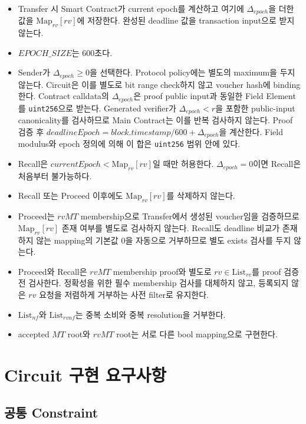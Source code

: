 \documentclass[11pt,a4paper]{extarticle}
\newcommand{\List}[1]{\mathrm{List}_{#1}}
\newcommand{\Map}[1]{\mathrm{Map}_{#1}}
\begin{document}
\begin{itemize}
  \item Transfer 시 Smart Contract가 current epoch를 계산하고 여기에
        $\Delta_{epoch}$을 더한 값을 $\Map{rv}[rv]$에 저장한다. 완성된 deadline
        값을 transaction input으로 받지 않는다.
  \item $EPOCH\_SIZE$는 600초다.
  \item Sender가 $\Delta_{epoch}\geq0$을 선택한다. Protocol policy에는 별도의
        maximum을 두지 않는다. Circuit은 이를 별도로 bit range check하지 않고
        voucher hash에 binding한다. Contract calldata의 $\Delta_{epoch}$은 proof public
        input과 동일한 Field Element를 \texttt{uint256}으로 받는다. Generated verifier가
        $\Delta_{epoch}<r$을 포함한 public-input canonicality를 검사하므로 Main Contract는
        이를 반복 검사하지 않는다. Proof 검증 후
        $deadlineEpoch=block.timestamp/600+\Delta_{epoch}$을 계산한다. Field modulus와
        epoch 정의에 의해 이 합은 \texttt{uint256} 범위 안에 있다.
  \item Recall은 $currentEpoch<\Map{rv}[rv]$일 때만 허용한다.
        $\Delta_{epoch}=0$이면 Recall은 처음부터 불가능하다.
  \item Recall 또는 Proceed 이후에도 $\Map{rv}[rv]$를 삭제하지 않는다.
  \item Proceed는 $rvMT$ membership으로 Transfer에서 생성된 voucher임을 검증하므로
        $\Map{rv}[rv]$ 존재 여부를 별도로 검사하지 않는다. Recall도 deadline 비교가
        존재하지 않는 mapping의 기본값 0을 자동으로 거부하므로 별도 exists 검사를 두지 않는다.
  \item Proceed와 Recall은 $rvMT$ membership proof와 별도로
        $rv\in\List{rv}$를 proof 검증 전 검사한다. 정확성을 위한 필수 membership 검사를
        대체하지 않고, 등록되지 않은 $rv$ 요청을 저렴하게 거부하는 사전 filter로 유지한다.
  \item $\List{nf}$와 $\List{rvnf}$는 중복 소비와 중복 resolution을 거부한다.
  \item accepted $MT$ root와 $rvMT$ root는 서로 다른 bool mapping으로 구현한다.
\end{itemize}

\section{Circuit 구현 요구사항}

\subsection{공통 Constraint}
\end{document}
